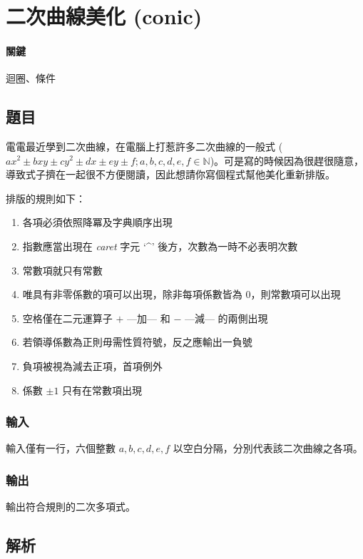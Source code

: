 \documentclass[a4paper,10pt]{article}
\begin{document}
\section{二次曲線美化 (conic)}

\paragraph{關鍵} 迴圈、條件

\subsection{題目}

電電最近學到二次曲線，在電腦上打惹許多二次曲線的一般式 ($ax^2 \pm bxy \pm cy^2 \pm dx \pm ey \pm f; a, b, c, d, e, f \in \mathbb{N}$)。可是寫的時候因為很趕很隨意，導致式子擠在一起很不方便閱讀，因此想請你寫個程式幫他美化重新排版。

排版的規則如下：
\begin{enumerate}
 \item 各項必須依照降冪及字典順序出現
 \item 指數應當出現在 \textit{caret} 字元 `\enspace\textbf{\^}' 後方，次數為一時不必表明次數
 \item 常數項就只有常數
 \item 唯具有非零係數的項可以出現，除非每項係數皆為 $0$，則常數項可以出現
 \item 空格僅在二元運算子 $\mathbf{+}$ ---加--- 和 $\mathbf{-}$ ---減--- 的兩側出現
 \item 若領導係數為正則毋需性質符號，反之應輸出一負號
 \item 負項被視為減去正項，首項例外
 \item 係數 $\pm1$ 只有在常數項出現
\end{enumerate}

\subsubsection{輸入}

輸入僅有一行，六個整數 $a, b, c, d, e, f$ 以空白分隔，分別代表該二次曲線之各項。

\subsubsection{輸出}

輸出符合規則的二次多項式。

\subsection{解析}
\end{document}
